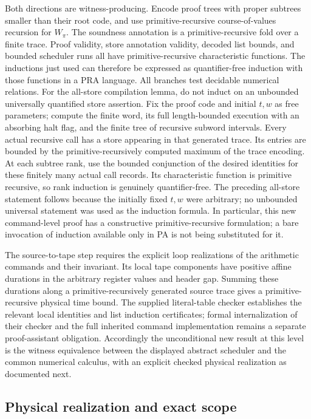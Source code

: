 Both directions are witness-producing. Encode proof trees with proper
subtrees smaller than their root code, and use primitive-recursive
course-of-values recursion for $W_\pi$. The soundness annotation is a
primitive-recursive fold over a finite trace. Proof validity, store
annotation validity, decoded list bounds, and bounded scheduler runs all
have primitive-recursive characteristic functions. The inductions just
used can therefore be expressed as quantifier-free induction with those
functions in a PRA language. All branches test decidable numerical
relations. For the all-store compilation lemma, do not induct on an
unbounded universally quantified store assertion. Fix the proof code and
initial $t,w$ as free parameters; compute the finite word, its full
length-bounded execution with an absorbing halt flag, and the finite tree
of recursive subword intervals. Every actual recursive call has a store
appearing in that generated trace. Its entries are bounded by the
primitive-recursively computed maximum of the trace encoding. At each
subtree rank, use the bounded conjunction of the desired identities for
these finitely many actual call records. Its characteristic function is
primitive recursive, so rank induction is genuinely quantifier-free.
The preceding all-store statement follows because the initially fixed
$t,w$ were arbitrary; no unbounded universal statement was used as the
induction formula. In particular, this new command-level proof has a constructive
primitive-recursive formulation; a bare invocation of induction available
only in PA is not being substituted for it.

The source-to-tape step requires the explicit loop realizations of the
arithmetic commands and their invariant. Its local tape components have
positive affine durations in the arbitrary register values and header
gap. Summing these durations along a primitive-recursively generated
source trace gives a primitive-recursive physical time bound. The supplied
literal-table checker establishes the relevant local identities and list
induction certificates; formal internalization of their checker and the
full inherited command implementation remains a separate proof-assistant
obligation. Accordingly the unconditional new result at this level is the
witness equivalence between the displayed abstract scheduler and the
common numerical calculus, with an explicit checked physical realization
as documented next.

\subsection{Physical realization and exact scope}

